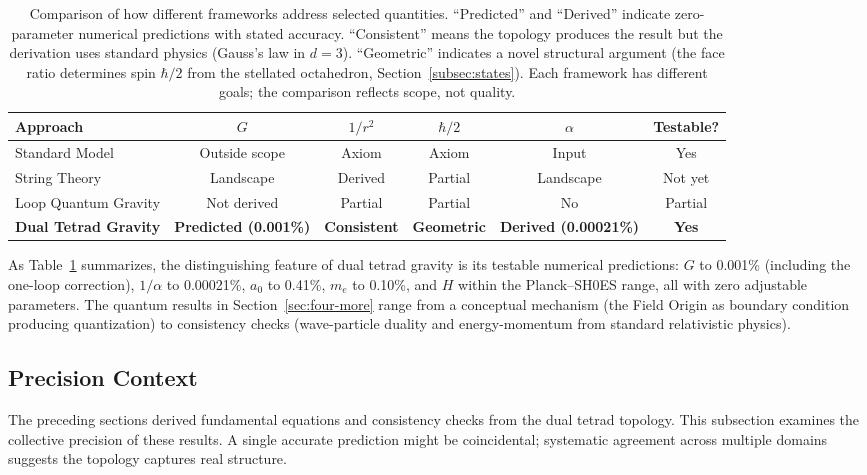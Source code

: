 \documentclass[aps,prd,preprint,superscriptaddress,showpacs,preprintnumbers,amsmath,amssymb,nofootinbib]{revtex4-2}
\begin{document}
\begin{table}[H]
\centering
\small
\begin{tabular*}{\textwidth}{@{\extracolsep{\fill}} lccccc @{}}
\toprule
\textbf{Approach} & \textbf{$G$} & \textbf{$1/r^2$} & \textbf{$\hbar/2$} & \textbf{$\alpha$} & \textbf{Testable?} \\
\midrule
Standard Model & Outside scope & Axiom & Axiom & Input & Yes \\
String Theory & Landscape & Derived & Partial & Landscape & Not yet \\
Loop Quantum Gravity & Not derived & Partial & Partial & No & Partial \\
\textbf{Dual Tetrad Gravity} & \textbf{Predicted (0.001\%)} & \textbf{Consistent} & \textbf{Geometric} & \textbf{Derived (0.00021\%)} & \textbf{Yes} \\
\bottomrule
\end{tabular*}
\caption{Comparison of how different frameworks address selected quantities. ``Predicted'' and ``Derived'' indicate zero-parameter numerical predictions with stated accuracy. ``Consistent'' means the topology produces the result but the derivation uses standard physics (Gauss's law in $d = 3$). ``Geometric'' indicates a novel structural argument (the face ratio determines spin $\hbar/2$ from the stellated octahedron, Section~\ref{subsec:states}). Each framework has different goals; the comparison reflects scope, not quality.}
\label{tab:comparison}
\end{table}

As Table~\ref{tab:comparison} summarizes, the distinguishing feature of dual tetrad gravity is its testable numerical predictions: $G$ to 0.001\% (including the one-loop correction), $1/\alpha$ to 0.00021\%, $a_0$ to 0.41\%, $m_e$ to 0.10\%, and $H$ within the Planck--SH0ES range, all with zero adjustable parameters. The quantum results in Section~\ref{sec:four-more} range from a conceptual mechanism (the Field Origin as boundary condition producing quantization) to consistency checks (wave-particle duality and energy-momentum from standard relativistic physics).

\subsection{Precision Context}
\label{subsec:precision}

The preceding sections derived fundamental equations and consistency checks from the dual tetrad topology. This subsection examines the collective precision of these results. A single accurate prediction might be coincidental; systematic agreement across multiple domains suggests the topology captures real structure.
\end{document}
